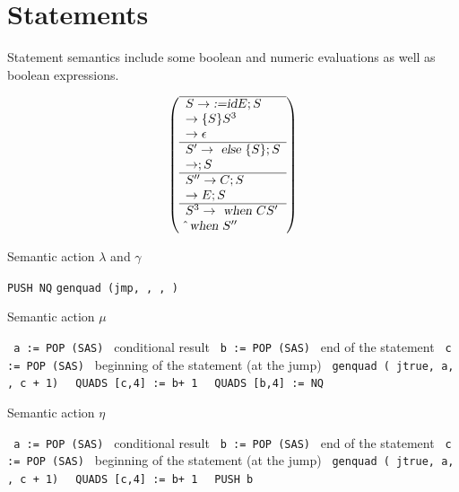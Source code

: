 \documentclass[11pt]{article}
\begin{document}
\newpage
\section {Statements}


Statement semantics include some boolean and numeric evaluations as well as boolean expressions.   

\[
\left(
\begin{array}{l}
\hline 
S \to \textsl{:=} \textsl{id} E ; S   \\
\to \{ S \} S^3   \\
\to \epsilon 	\\
\hline
S' \to \textsl{ else } \{ S \} ; S   \\
\to ; S	\\
\hline
S'' \to C ; S   	\\
\to E ; S   		\\
\hline
S^3 \to \textsl{ when } C S'   \\
\hat{ } \textsl{ when } S''   \\
\end{array}
\right)
\]

\begin {algorithm}
\caption{ Semantic action $\lambda$ and $\gamma$ }
\label{alg:lambda0}
\begin{algorithmic}
\STATE \texttt {PUSH NQ}
\STATE \texttt {genquad (jmp, , , ) }
\end{algorithmic}
\end{algorithm}

\begin {algorithm}
\caption{ Semantic action $\mu$ }
\label{alg:lambda2}
\begin{algorithmic}
\STATE \texttt { a := POP (SAS) }  conditional result
\STATE \texttt { b := POP (SAS) }  end of the statement
\STATE \texttt { c := POP (SAS) }  beginning of the statement (at the jump)
\STATE \texttt { genquad ( jtrue, a, , c + 1) }
\STATE \texttt { QUADS [c,4] := b+ 1 }
\STATE \texttt { QUADS [b,4] := NQ }
\end{algorithmic}
\end{algorithm}

\begin {algorithm}
\caption{ Semantic action $\eta$ }
\label{alg:lambda3}
\begin{algorithmic}
\STATE \texttt { a := POP (SAS) }  conditional result
\STATE \texttt { b := POP (SAS) }  end of the statement
\STATE \texttt { c := POP (SAS) }  beginning of the statement (at the jump)
\STATE \texttt { genquad ( jtrue, a, , c + 1) }
\STATE \texttt { QUADS [c,4] := b+ 1 }
\STATE \texttt { PUSH b}
\end{algorithmic}
\end{algorithm}
\end{document}
